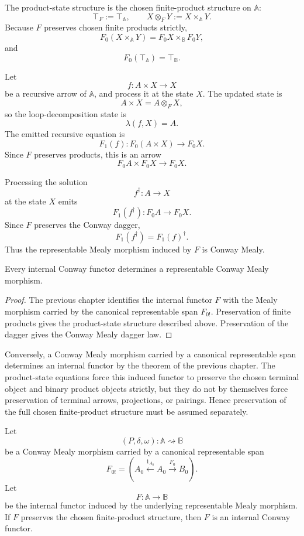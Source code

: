 The product-state structure is the chosen finite-product structure on
\(\mathbb A\):
\[
\top_F:=\top_{\mathbb A},
\qquad
X\otimes_F Y:=X\times_{\mathbb A}Y.
\]
Because \(F\) preserves chosen finite products strictly,
\[
F_0(X\times_{\mathbb A}Y)
=
F_0X\times_{\mathbb B}F_0Y,
\]
and
\[
F_0(\top_{\mathbb A})=\top_{\mathbb B}.
\]

Let
\[
f:A\times X\to X
\]
be a recursive arrow of \(\mathbb A\), and process it at the state \(X\).  The
updated state is
\[
A\times X
=
A\otimes_F X,
\]
so the loop-decomposition state is
\[
\lambda(f,X)=A.
\]
The emitted recursive equation is
\[
F_1(f):F_0(A\times X)\to F_0X.
\]
Since \(F\) preserves products, this is an arrow
\[
F_0A\times F_0X\to F_0X.
\]

Processing the solution
\[
f^\dagger:A\to X
\]
at the state \(X\) emits
\[
F_1(f^\dagger):F_0A\to F_0X.
\]
Since \(F\) preserves the Conway dagger,
\[
F_1(f^\dagger)
=
F_1(f)^\dagger.
\]
Thus the representable Mealy morphism induced by \(F\) is Conway Mealy.

\begin{proposition}
\label{prop:internal-conway-functors-representable-conway-mealy}
Every internal Conway functor determines a representable Conway Mealy
morphism.
\end{proposition}

\begin{proof}
The previous chapter identifies the internal functor \(F\) with the Mealy
morphism carried by the canonical representable span \(F_{0!}\).  Preservation
of finite products gives the product-state structure described above.
Preservation of the dagger gives the Conway Mealy dagger law.
\end{proof}

Conversely, a Conway Mealy morphism carried by a canonical representable span
determines an internal functor by the theorem of the previous chapter.  The
product-state equations force this induced functor to preserve the chosen
terminal object and binary product objects strictly, but they do not by
themselves force preservation of terminal arrows, projections, or pairings.
Hence preservation of the full chosen finite-product structure must be assumed
separately.

\begin{proposition}
\label{prop:representable-conway-mealy-to-internal-conway-functor}
Let
\[
(P,\delta,\omega):\mathbb A\rightsquigarrow\mathbb B
\]
be a Conway Mealy morphism carried by a canonical representable span
\[
F_{0!}
=
\left(
A_0
\xleftarrow{1_{A_0}}
A_0
\xrightarrow{F_0}
B_0
\right).
\]
Let
\[
F:\mathbb A\to\mathbb B
\]
be the internal functor induced by the underlying representable Mealy
morphism.  If \(F\) preserves the chosen finite-product structure, then \(F\)
is an internal Conway functor.
\end{proposition}

